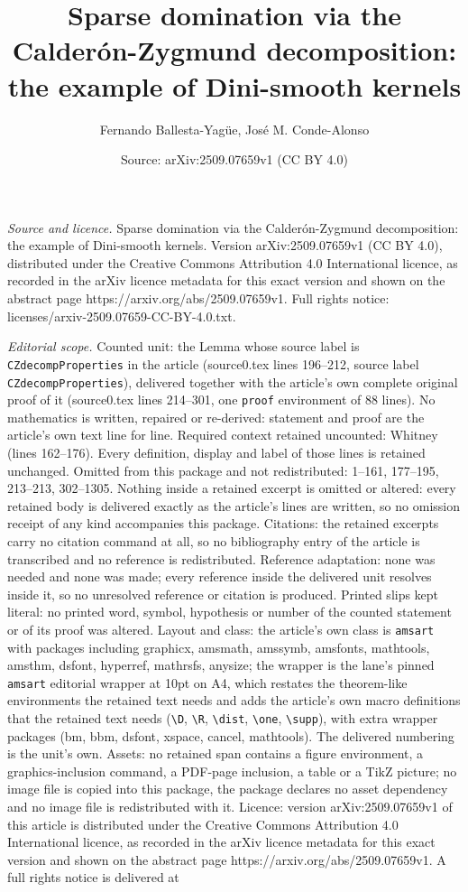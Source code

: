 \documentclass[10pt,a4paper]{amsart}
\title[Sparse domination via the Calder\'on-Zygmund decomposition: ]{Sparse domination via the Calder\'on-Zygmund decomposition: the example of Dini-smooth kernels}
\author{Fernando Ballesta-Yag\"ue, Jos\'e M. Conde-Alonso}
\date{Source: arXiv:2509.07659v1 (CC BY 4.0)}
\begin{document}
\maketitle

\noindent\emph{Source and licence.} Sparse domination via the Calder\'on-Zygmund decomposition: the example of Dini-smooth kernels. Version arXiv:2509.07659v1 (CC BY 4.0), distributed under the Creative Commons Attribution 4.0 International licence, as recorded in the arXiv licence metadata for this exact version and shown on the abstract page https://arxiv.org/abs/2509.07659v1. Full rights notice: licenses/arxiv-2509.07659-CC-BY-4.0.txt.\par\smallskip

\noindent\textit{Editorial scope.} Counted unit: the Lemma whose source label is \texttt{CZdecompProperties} in the article (source0.tex lines 196--212, source label \texttt{CZdecompProperties}), delivered together with the article's own complete original proof of it (source0.tex lines 214--301, one \texttt{proof} environment of 88 lines). No mathematics is written, repaired or re-derived: statement and proof are the article's own text line for line. Required context retained uncounted: Whitney (lines 162--176). Every definition, display and label of those lines is retained unchanged. Omitted from this package and not redistributed: 1--161, 177--195, 213--213, 302--1305. Nothing inside a retained excerpt is omitted or altered: every retained body is delivered exactly as the article's lines are written, so no omission receipt of any kind accompanies this package. Citations: the retained excerpts carry no citation command at all, so no bibliography entry of the article is transcribed and no reference is redistributed. Reference adaptation: none was needed and none was made; every reference inside the delivered unit resolves inside it, so no unresolved reference or citation is produced. Printed slips kept literal: no printed word, symbol, hypothesis or number of the counted statement or of its proof was altered. Layout and class: the article's own class is \texttt{amsart} with packages including graphicx, amsmath, amssymb, amsfonts, mathtools, amsthm, dsfont, hyperref, mathrsfs, anysize; the wrapper is the lane's pinned \texttt{amsart} editorial wrapper at 10pt on A4, which restates the theorem-like environments the retained text needs and adds the article's own macro definitions that the retained text needs (\texttt{\textbackslash D}, \texttt{\textbackslash R}, \texttt{\textbackslash dist}, \texttt{\textbackslash one}, \texttt{\textbackslash supp}), with extra wrapper packages (bm, bbm, dsfont, xspace, cancel, mathtools). The delivered numbering is the unit's own. Assets: no retained span contains a figure environment, a graphics-inclusion command, a PDF-page inclusion, a table or a TikZ picture; no image file is copied into this package, the package declares no asset dependency and no image file is redistributed with it. Licence: version arXiv:2509.07659v1 of this article is distributed under the Creative Commons Attribution 4.0 International licence, as recorded in the arXiv licence metadata for this exact version and shown on the abstract page https://arxiv.org/abs/2509.07659v1. A full rights notice is delivered at 
\end{document}
